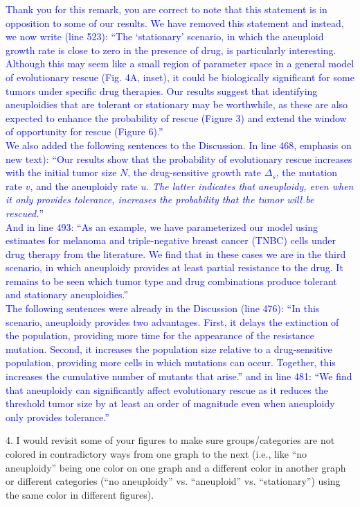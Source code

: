 \documentclass[12pt]{extarticle}
\begin{document}
\textcolor{blue}{
Thank you for this remark, you are correct to note that this statement is in opposition to some of our results. We have removed this statement and instead, we now write (line 523): ``The `stationary' scenario, in which the aneuploid growth rate is close to zero in the presence of drug, is particularly interesting. Although this may seem like a small region of parameter space in a general model of evolutionary rescue (Fig. 4A, inset), it could be biologically significant for some tumors under specific drug therapies. 
Our results suggest that identifying aneuploidies that are tolerant or stationary may be worthwhile, as these are also expected to enhance the probability of rescue (Figure 3) and extend the window of opportunity for rescue (Figure 6).''\\
We also added the following sentences to the Discussion.
In line 468, emphasis on new text): ``Our results show that the probability of evolutionary rescue increases with the initial tumor size $N$, the drug-sensitive growth rate $\Delta_s$, the mutation rate $v$, and the aneuploidy rate $u$. \emph{The latter indicates that aneuploidy, even when it only provides tolerance, increases the probability that the tumor will be rescued.}'' \\
And in line 493: ``As an example, we have parameterized our model using estimates for melanoma and triple-negative breast cancer (TNBC) cells under drug therapy from the literature. We find that in these cases we are in the third scenario, in which aneuploidy provides at least partial resistance to the drug. It remains to be seen which tumor type and drug combinations produce tolerant and stationary aneuploidies.''\\
The following sentences were already in the Discussion (line 476): ``In this scenario, aneuploidy provides two advantages. First, it delays the extinction of the population, providing more time for the appearance of the resistance mutation. 
Second, it increases the population size relative to a drug-sensitive population, providing more cells in which mutations can occur. 
Together, this increases the cumulative number of mutants that arise.'' and in line 481: ``We find that aneuploidy can significantly affect evolutionary rescue as it reduces the threshold tumor size by at least an order of magnitude even when aneuploidy only provides tolerance.''
} 

4. I would revisit some of your figures to make sure groups/categories are not colored in contradictory ways from one graph to the next (i.e., like ``no aneuploidy'' being one color on one graph and a different color in another graph or different categories (``no aneuploidy'' vs. ``aneuploid'' vs. ``stationary'') using the same color in different figures).
\end{document}
